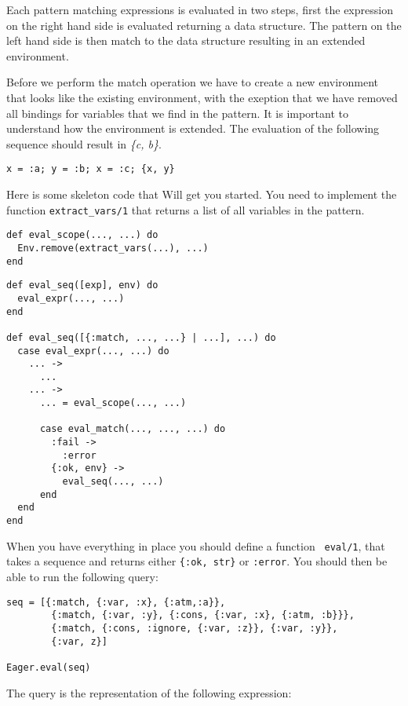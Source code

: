 \documentclass[a4paper,11pt]{article}
\begin{document}
Each pattern matching expressions is evaluated in two steps, first the
expression on the right hand side is evaluated returning a data
structure. The pattern on the left hand side is then match to the data
structure resulting in an extended environment.

Before we perform the match operation we have to create a new
environment that looks like the existing environment, with the
exeption that we have removed all bindings for variables that we find
in the pattern.  It is important to understand how the environment is
extended. The evaluation of the following sequence should result in
{\em \{c, b\}}.

\begin{verbatim}
x = :a; y = :b; x = :c; {x, y}
\end{verbatim}

Here is some skeleton code that Will get you started. You need to
implement the function {\tt extract_vars/1} that returns a list of all
variables in the pattern.

\begin{verbatim}
def eval_scope(..., ...) do
  Env.remove(extract_vars(...), ...)
end
\end{verbatim}

\begin{verbatim}
def eval_seq([exp], env) do
  eval_expr(..., ...)
end

def eval_seq([{:match, ..., ...} | ...], ...) do
  case eval_expr(..., ...) do
    ... ->
      ...
    ... ->
      ... = eval_scope(..., ...)

      case eval_match(..., ..., ...) do
        :fail ->
          :error
        {:ok, env} ->
          eval_seq(..., ...)
      end
  end
end
\end{verbatim}

When you have everything in place you should define a function {\tt
  eval/1}, that takes a sequence and returns either {\tt \{:ok, str\}}
or {\tt :error}. You should then be able to run the following query:

\begin{verbatim}
seq = [{:match, {:var, :x}, {:atm,:a}},
        {:match, {:var, :y}, {:cons, {:var, :x}, {:atm, :b}}},
        {:match, {:cons, :ignore, {:var, :z}}, {:var, :y}},
        {:var, z}]

Eager.eval(seq)
\end{verbatim}

The query is the representation of the following expression:
\end{document}
